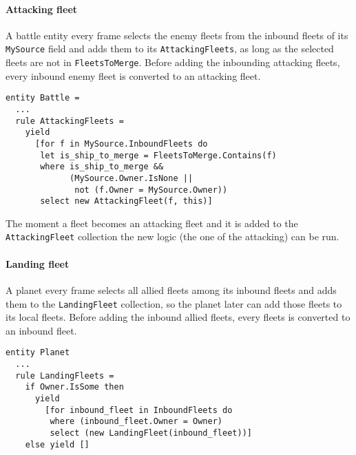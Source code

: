 \paragraph{Attacking fleet}
A battle entity every frame selects the enemy fleets from the inbound fleets of its \texttt{MySource} field and adds them to its \texttt{AttackingFleets}, as long as the selected fleets are not in \texttt{FleetsToMerge}. Before adding the inbounding attacking fleets, every inbound enemy fleet is converted to an attacking fleet.
\begin{lstlisting}
entity Battle =
  ...
  rule AttackingFleets =
    yield
      [for f in MySource.InboundFleets do
       let is_ship_to_merge = FleetsToMerge.Contains(f)
       where is_ship_to_merge &&
             (MySource.Owner.IsNone || 
              not (f.Owner = MySource.Owner))
       select new AttackingFleet(f, this)]
\end{lstlisting}

\noindent
The moment a fleet becomes an attacking fleet and it is added to the \texttt{AttackingFleet} collection the new logic (the one of the attacking) can be run.

\paragraph{Landing fleet}
A planet every frame selects all allied fleets among its inbound fleets and adds them to the \texttt{LandingFleet} collection, so the planet later can add those fleets to its local fleets. Before adding the inbound allied fleets, every fleets is converted to an inbound fleet.
\begin{lstlisting}
entity Planet
  ...
  rule LandingFleets =
    if Owner.IsSome then
      yield
        [for inbound_fleet in InboundFleets do
         where (inbound_fleet.Owner = Owner)
         select (new LandingFleet(inbound_fleet))]
    else yield []
\end{lstlisting}
